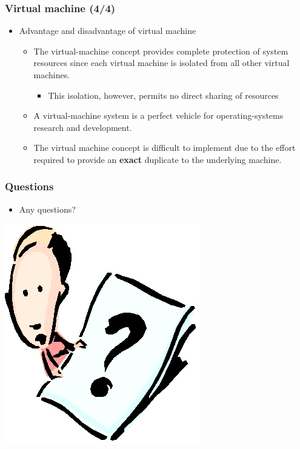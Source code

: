 \documentclass[CJKutf8,xcolor=pdftex,dvipsnames,table]{beamer}
\begin{document}
\begin{CJK*}{UTF8}{song}
  \begin{frame}
    \frametitle{Virtual machine (4/4)} \pause
    \begin{itemize}
    \item{Advantage and disadvantage of virtual machine} \pause
      \begin{itemize}
      \item{The virtual-machine concept provides complete protection of system resources since each virtual machine is isolated from all other virtual machines.} \pause
        \begin{itemize}
        \item{This isolation, however, permits no direct sharing of resources} \pause
        \end{itemize}
      \item{A virtual-machine system is a perfect vehicle for operating-systems research and development.} \pause
      \item{The virtual machine concept is difficult to implement due to the effort required to provide an \textbf{exact} duplicate to the underlying machine.}
      \end{itemize}
    \end{itemize}
  \end{frame}
  
  \begin{frame}
    \frametitle{Questions}
    \begin{itemize}
    \item{Any questions?}
    \end{itemize}
    \begin{center}
      \includegraphics[scale=.5]{question}
    \end{center}
  \end{frame}


\end{CJK*}
\end{document}

